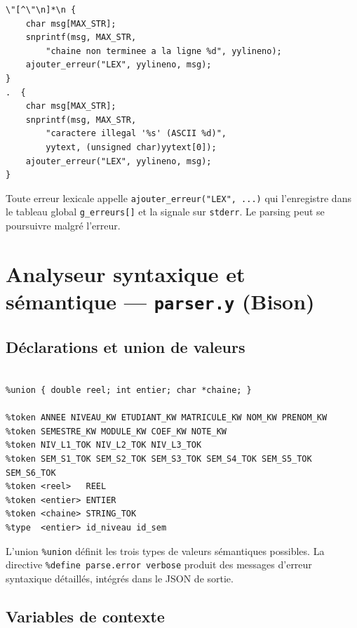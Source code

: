 \documentclass[10pt,a4paper]{article}
\begin{document}
\begin{lstlisting}[style=styleFlex, caption={Collecte des erreurs lexicales dans \texttt{g\_erreurs[]}}]
\"[^\"\n]*\n {
    char msg[MAX_STR];
    snprintf(msg, MAX_STR,
        "chaine non terminee a la ligne %d", yylineno);
    ajouter_erreur("LEX", yylineno, msg);
}
.  {
    char msg[MAX_STR];
    snprintf(msg, MAX_STR,
        "caractere illegal '%s' (ASCII %d)",
        yytext, (unsigned char)yytext[0]);
    ajouter_erreur("LEX", yylineno, msg);
}
\end{lstlisting}

Toute erreur lexicale appelle \texttt{ajouter\_erreur("LEX", ...)} qui l'enregistre
dans le tableau global \texttt{g\_erreurs[]} et la signale sur \texttt{stderr}.
Le parsing peut se poursuivre malgré l'erreur.

\section{Analyseur syntaxique et sémantique --- \texttt{parser.y} (Bison)}

\subsection{Déclarations et union de valeurs}

\begin{lstlisting}[style=styleBison, caption={Déclarations Bison --- union et tokens}]
%define parse.error verbose

%union { double reel; int entier; char *chaine; }

%token ANNEE NIVEAU_KW ETUDIANT_KW MATRICULE_KW NOM_KW PRENOM_KW
%token SEMESTRE_KW MODULE_KW COEF_KW NOTE_KW
%token NIV_L1_TOK NIV_L2_TOK NIV_L3_TOK
%token SEM_S1_TOK SEM_S2_TOK SEM_S3_TOK SEM_S4_TOK SEM_S5_TOK SEM_S6_TOK
%token <reel>   REEL
%token <entier> ENTIER
%token <chaine> STRING_TOK
%type  <entier> id_niveau id_sem
\end{lstlisting}

L'union \texttt{\%union} définit les trois types de valeurs sémantiques possibles.
La directive \texttt{\%define parse.error verbose} produit des messages d'erreur
syntaxique détaillés, intégrés dans le JSON de sortie.

\subsection{Variables de contexte}
\end{document}
